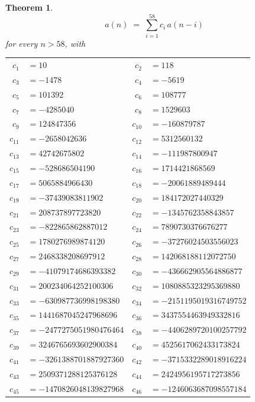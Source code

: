 \documentclass[11pt,a4paper]{article}
\theoremstyle{plain}
\newtheorem{theorem}{Theorem}
\theoremstyle{definition}
\begin{document}
\begin{theorem}
\[
a(n)\;=\;\sum_{i=1}^{58}c_i\,a(n-i)
\]
for every $n>58$, with
\begin{center}\footnotesize
\begin{tabular}{r@{\,}l@{\qquad}r@{\,}l}
$c_{1}$ & $=10$ & $c_{2}$ & $=118$ \\
$c_{3}$ & $=-1478$ & $c_{4}$ & $=-5619$ \\
$c_{5}$ & $=101392$ & $c_{6}$ & $=108777$ \\
$c_{7}$ & $=-4285040$ & $c_{8}$ & $=1529603$ \\
$c_{9}$ & $=124847356$ & $c_{10}$ & $=-160879787$ \\
$c_{11}$ & $=-2658042636$ & $c_{12}$ & $=5312560132$ \\
$c_{13}$ & $=42742675802$ & $c_{14}$ & $=-111987800947$ \\
$c_{15}$ & $=-528686504190$ & $c_{16}$ & $=1714421868569$ \\
$c_{17}$ & $=5065884966430$ & $c_{18}$ & $=-20061889489444$ \\
$c_{19}$ & $=-37439083811902$ & $c_{20}$ & $=184172027440329$ \\
$c_{21}$ & $=208737897723820$ & $c_{22}$ & $=-1345762358843857$ \\
$c_{23}$ & $=-822865862887012$ & $c_{24}$ & $=7890730376676277$ \\
$c_{25}$ & $=1780276989874120$ & $c_{26}$ & $=-37276024503556023$ \\
$c_{27}$ & $=2468338208697912$ & $c_{28}$ & $=142068188112072750$ \\
$c_{29}$ & $=-41079174686393382$ & $c_{30}$ & $=-436662905564886877$ \\
$c_{31}$ & $=200234064252100306$ & $c_{32}$ & $=1080885323295369880$ \\
$c_{33}$ & $=-630987736998198380$ & $c_{34}$ & $=-2151195019316749752$ \\
$c_{35}$ & $=1441687045247968696$ & $c_{36}$ & $=3437554463949332816$ \\
$c_{37}$ & $=-2477275051980476464$ & $c_{38}$ & $=-4406289720100257792$ \\
$c_{39}$ & $=3246765693602900384$ & $c_{40}$ & $=4525617062433173824$ \\
$c_{41}$ & $=-3261388701887927360$ & $c_{42}$ & $=-3715332289018916224$ \\
$c_{43}$ & $=2509371288125376128$ & $c_{44}$ & $=2424956195717273856$ \\
$c_{45}$ & $=-1470826048139827968$ & $c_{46}$ & $=-1246063687098557184$ \\

\end{tabular}
\end{center}
\end{theorem}
\end{document}
